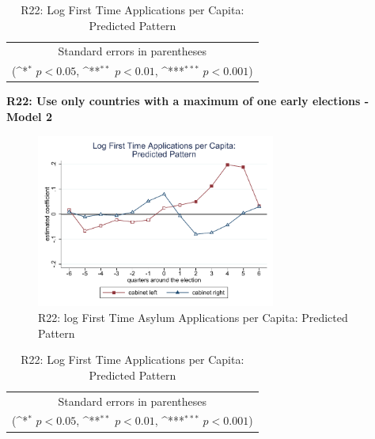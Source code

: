\documentclass[10pt,a4paper]{scrartcl}
\begin{document}
\begin{table}[!ht]\centering
	\renewcommand{\arraystretch}{1.25}
	\def\sym#1{\ifmmode^{#1}\else\(^{#1}\)\fi}
	\caption{R22: Log First Time Applications per Capita: Predicted Pattern}
	\begin{tabular}{l*{2}{c}}
		\hline\hline
		
		\hline\hline
		\multicolumn{3}{c}{\footnotesize Standard errors in parentheses} \\
		\multicolumn{3}{c}{\footnotesize (\sym{*} \(p<0.05\), \sym{**} \(p<0.01\), \sym{***} \(p<0.001\))}\\
	\end{tabular}
\end{table}

\clearpage
\textbf{R22: Use only countries with a maximum of one early elections - Model 2}
\begin{figure}[!ht]
	\centering
	\includegraphics[width=0.7\textwidth]{figures_edited/app_graph2_R22.pdf}
	\caption{R22: log First Time Asylum Applications per Capita: Predicted Pattern}
\end{figure}

\begin{table}[!ht]\centering
	\footnotesize
	\renewcommand{\arraystretch}{1.2}
	\def\sym#1{\ifmmode^{#1}\else\(^{#1}\)\fi}
	\caption{R22: Log First Time Applications per Capita: Predicted Pattern}
	\begin{tabular}{l*{2}{c}}
		\hline\hline
		
		\hline\hline
		\multicolumn{3}{c}{\footnotesize Standard errors in parentheses} \\
		\multicolumn{3}{c}{\footnotesize (\sym{*} \(p<0.05\), \sym{**} \(p<0.01\), \sym{***} \(p<0.001\))} \\
	\end{tabular}
\end{table}
\end{document}
